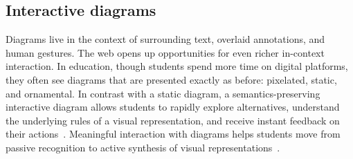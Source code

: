 


\subsection{Interactive diagrams}


Diagrams live in the context of surrounding text, overlaid annotations, and human gestures. The web opens up opportunities for even richer in-context interaction. In education, though students spend more time on digital platforms, they often see diagrams that are presented exactly as before: pixelated, static, and ornamental. In contrast with a static diagram, a semantics-preserving interactive diagram allows students to rapidly explore alternatives, understand the underlying rules of a visual representation, and receive instant feedback on their actions~\cite{koedinger_learning_2015}. Meaningful interaction with diagrams helps students move from passive recognition to active synthesis of visual representations~\cite{bloomRevised}.

